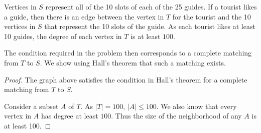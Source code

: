 \documentclass[a4paper]{exam}
\begin{document}
\begin{questions}
\begin{solution}
Vertices in $S$ represent all of the 10 slots of each of the 25 guides. If a tourist likes a guide, then there is an edge between the vertex in $T$ for the tourist and the 10 vertices in $S$ that represent the 10 slots of the guide. As each tourist likes at least 10 guides, the degree of each vertex in $T$ is at least $100$.

The condition required in the problem then corresponds to a complete matching from $T$ to $S$. We show using Hall's theorem that such a matching exists.

\begin{proof} The graph above satisfies the condition in Hall's theorem for a complete matching from $T$ to $S$.
  
Consider a subset $A$ of $T$. As $|T|=100$, $|A|\le 100$. We also know that every vertex in $A$ has degree at least $100$. Thus the size of the neighborhood of any $A$ is at least 100.
\end{proof}
\end{solution}

\end{questions}
\end{document}

